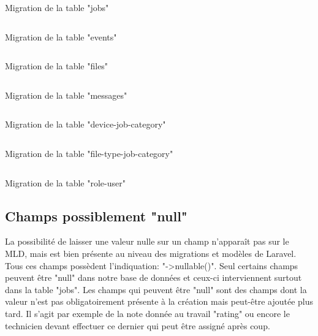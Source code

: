 \documentclass[
    iai, %
    il, %
]{heig-tb}
\begin{document}
\begin{listing}[h]
    \inputminted{php}{assets/code/16_create_jobs_table.php}
    \caption{Migration de la table "jobs" \label{migrations-jobs}}
\end{listing}

\begin{listing}[h]
    \inputminted{php}{assets/code/17_create_events_table.php}
    \caption{Migration de la table "events" \label{migrations-events}}
\end{listing}

\begin{listing}[h]
    \inputminted{php}{assets/code/18_create_files_table.php}
    \caption{Migration de la table "files" \label{migrations-files}}
\end{listing}

\begin{listing}[h]
    \inputminted{php}{assets/code/19_create_messages_table.php}
    \caption{Migration de la table "messages" \label{migrations-messages}}
\end{listing}

\begin{listing}[h]
    \inputminted{php}{assets/code/20_create_device_job_category_table.php}
    \caption{Migration de la table "device-job-category" \label{migrations-device-job-category}}
\end{listing}

\begin{listing}[h]
    \inputminted{php}{assets/code/21_create_file_type_job_category_table.php}
    \caption{Migration de la table "file-type-job-category" \label{migrations-file-type-job-category}}
\end{listing}

\begin{listing}[h]
    \inputminted{php}{assets/code/22_create_role_user_table.php}
    \caption{Migration de la table "role-user" \label{migrations-role-user}}
\end{listing}

\subsection{Champs possiblement "null"}
La possibilité de laisser une valeur nulle sur un champ n'apparaît pas sur le MLD, mais est bien présente au niveau des migrations et modèles de Laravel.\newline
Tous ces champs possèdent l'indiquation: "->nullable()".\newline
Seul certains champs peuvent être "null" dans notre base de données et ceux-ci interviennent surtout dans la table "jobs".\newline
Les champs qui peuvent être "null" sont des champs dont la valeur n'est pas obligatoirement présente à la création mais peut-être ajoutée plus tard. Il s'agit par exemple de la note donnée au travail "rating" ou encore le technicien devant effectuer ce dernier qui peut être assigné après coup.
\end{document}
